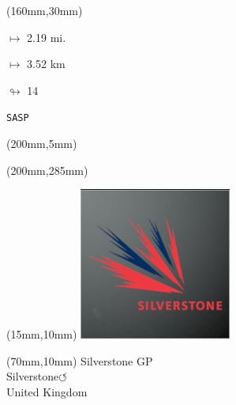 \begin{textblock*}{40mm}(160mm,30mm)%
\Large
\par$\mapsto$ 2.19 mi.
\par$\mapsto$ 3.52 km
\par$\looparrowright$ 14
\par\hfill\tiny\tt SASP\\
\end{textblock*}
\begin{textblock*}{20mm}(200mm,5mm)%
\fbox{\thepage}
\label{SASP}
\end{textblock*}
\begin{textblock*}{20mm}(200mm,285mm)%
\fbox{\thepage}
\end{textblock*}

\null\newpage
\begin{textblock*}{50mm}(15mm,10mm)%
\includegraphics[width=50mm]{LG/2015-05-20_00094.png}
\end{textblock*}
\begin{textblock*}{130mm}(70mm,10mm)%
{\fontsize{20}{20}\selectfont Silverstone GP\\}
{\fontsize{16}{16}\selectfont Silverstone\hfill \huge$\circlearrowleft$\\}
{\fontsize{12}{12}\selectfont United Kingdom\\}
\end{textblock*}
